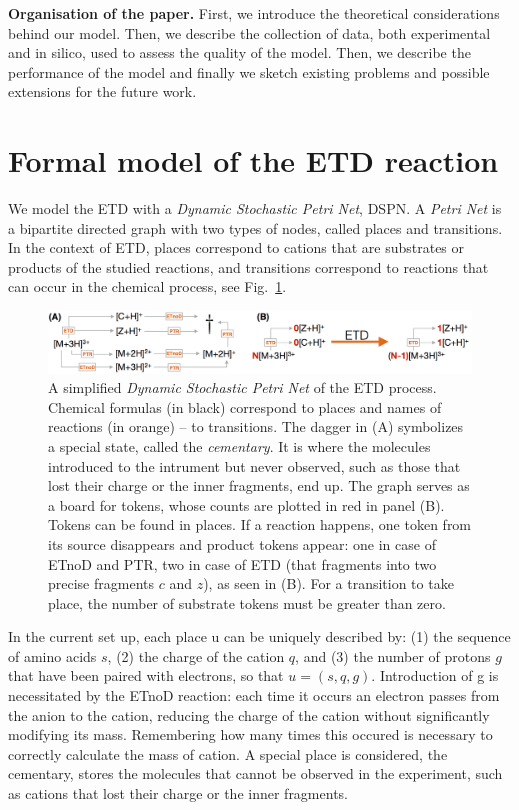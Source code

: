 \documentclass{llncs}
\begin{document}
\textbf{Organisation of the paper.}
        First, we introduce the theoretical considerations behind our model. Then, we describe the collection of data, both experimental and in silico, used to assess the quality of the model. Then, we describe the performance of the model and finally we sketch existing problems and possible extensions for the future work.

\section{Formal model of the ETD reaction}
        We model the ETD with a \textit{Dynamic Stochastic Petri Net}, DSPN. A \textit{Petri Net} is a bipartite directed graph with two types of nodes, called places and transitions\cite{Petri2008}. In the context of ETD, places correspond to cations that are substrates or products of the studied reactions, and transitions correspond to reactions that can occur in the chemical process, see Fig.~\ref{img::petrinet}.

        \begin{figure}[th]
                \center
                \includegraphics[width=\textwidth]{petrinet.png}
                \caption{A simplified \textit{Dynamic Stochastic Petri Net} of the ETD process. Chemical formulas (in black) correspond to places and names of reactions (in orange) -- to transitions. The dagger in (A) symbolizes a special state, called the \textit{cementary}. It is where the molecules introduced to the intrument but never observed, such as those that lost their charge or the inner fragments, end up. The graph serves as a board for tokens, whose counts are plotted in red in panel (B). Tokens can be found in places. If a reaction happens, one token from its source disappears and product tokens appear: one in case of ETnoD and PTR, two in case of ETD (that fragments into two precise fragments $c$ and $z$), as seen in (B). For a transition to take place, the number of substrate tokens must be greater than zero.}\label{img::petrinet}
        \end{figure}

        In the current set up, each place u can be uniquely described by: (1) the sequence of amino acids $s$, (2) the charge of the cation $q$, and (3) the number of protons $g$ that have been paired with electrons, so that $u = (s,q,g)$. Introduction of g is necessitated by the ETnoD reaction: each time it occurs an electron passes from the anion to the cation, reducing the charge of the cation without significantly modifying its mass. Remembering how many times this occured is necessary to correctly calculate the mass of cation. A special place is considered, the cementary, stores the molecules that cannot be observed in the experiment, such as cations that lost their charge or the inner fragments.
\end{document}
